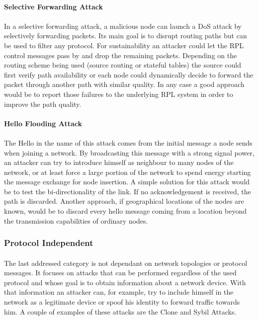 \paragraph{\textbf{Selective Forwarding Attack}}
\paragraph{}
In a selective forwarding attack, a malicious node can launch a \ac{DoS} attack by selectively forwarding packets. Its main goal is to disrupt routing paths but can be used to filter any protocol. For sustainability an attacker could let the RPL control messages pass by and drop the remaining packets. Depending on the routing scheme being used (source routing or stateful tables) the source could first verify path availability or each node could dynamically decide to forward the packet through another path with similar quality. In any case a good approach would be to report those failures to the underlying RPL system in order to improve the path quality.

\paragraph{\textbf{Hello Flooding Attack}}
\paragraph{}
The Hello in the name of this attack comes from the initial message a node sends when joining a network. By broadcasting this message with a strong signal power, an attacker can try to introduce himself as neighbour to many nodes of the network, or at least force a large portion of the network to spend energy starting the message exchange for node insertion. A simple solution for this attack would be to test the bi-directionality of the link. If no acknowledgement is received, the path is discarded. Another approach, if geographical locations of the nodes are known, would be to discard every hello message coming from a location beyond the transmission capabilities of ordinary nodes.

\subsubsection{Protocol Independent}
\paragraph{}
The last addressed category is not dependant on network topologies or protocol messages. It focuses on attacks that can be performed regardless of the used protocol and whose goal is to obtain information about a network device. With that information an attacker can, for example, try to include himself in the network as a legitimate device or spoof his identity to forward traffic towards him. A couple of examples of these attacks are the Clone and Sybil Attacks.

